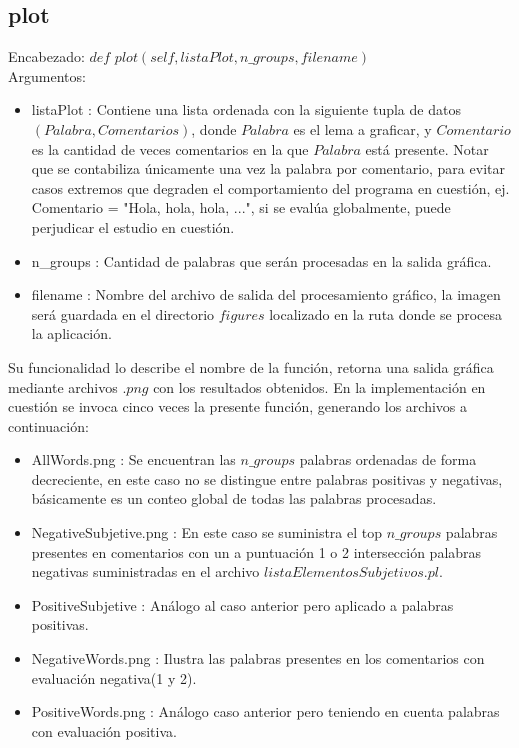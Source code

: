 \documentclass[12pt]{article}
\begin{document}
\subsection{plot}
Encabezado: $def$ $plot(self, listaPlot, n\_groups, filename)$ \\
Argumentos:
\begin{itemize}
  \item listaPlot : Contiene una lista ordenada con la siguiente tupla de datos $(Palabra, Comentarios)$, donde $Palabra$ es el lema a graficar, y $Comentario$ es la cantidad de veces comentarios en la que $Palabra$ está presente. Notar que se contabiliza únicamente una vez la palabra por comentario, para evitar casos extremos que degraden el comportamiento del programa en cuestión, ej. Comentario = "Hola, hola, hola, ...", si se evalúa globalmente, puede perjudicar el estudio en cuestión.
  \item n\_groups : Cantidad de palabras que serán procesadas en la salida gráfica.
  \item filename : Nombre del archivo de salida del procesamiento gráfico, la imagen será guardada en el directorio $figures$ localizado en la ruta donde se procesa la aplicación.
\end{itemize}

Su funcionalidad lo describe el nombre de la función, retorna una salida gráfica mediante archivos $.png$ con los resultados obtenidos.
En la implementación en cuestión se invoca cinco veces la presente función, generando los archivos a continuación:
\begin{itemize}
  \item AllWords.png : Se encuentran las $n\_groups$ palabras ordenadas de forma decreciente, en este caso no se distingue entre palabras positivas y negativas, básicamente es un conteo global de todas las palabras procesadas.
  \item NegativeSubjetive.png : En este caso se suministra el top $n\_groups$ palabras presentes en comentarios con un a puntuación 1 o 2 intersección palabras negativas suministradas en el archivo $listaElementosSubjetivos.pl$.
  \item PositiveSubjetive : Análogo al caso anterior pero aplicado a palabras positivas.
  \item NegativeWords.png : Ilustra las palabras presentes en los comentarios con evaluación negativa(1 y 2).
  \item PositiveWords.png : Análogo caso anterior pero teniendo en cuenta palabras con evaluación positiva.
\end{itemize}
\end{document}
